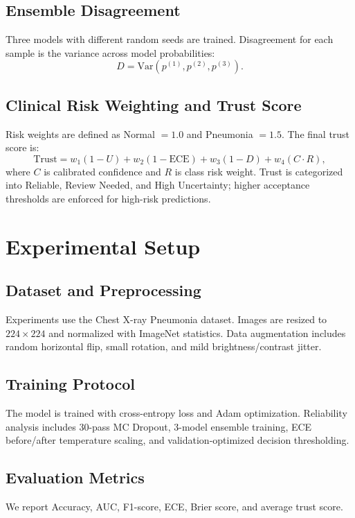 \documentclass[conference]{IEEEtran}
\begin{document}
\subsection{Ensemble Disagreement}
Three models with different random seeds are trained. Disagreement for each sample is the variance across model probabilities:
\begin{equation}
D = \mathrm{Var}(p^{(1)}, p^{(2)}, p^{(3)}).
\end{equation}

\subsection{Clinical Risk Weighting and Trust Score}
Risk weights are defined as Normal $=1.0$ and Pneumonia $=1.5$. The final trust score is:
\begin{equation}
\mathrm{Trust} = w_1(1-U) + w_2(1-\mathrm{ECE}) + w_3(1-D) + w_4(C\cdot R),
\end{equation}
where $C$ is calibrated confidence and $R$ is class risk weight. Trust is categorized into Reliable, Review Needed, and High Uncertainty; higher acceptance thresholds are enforced for high-risk predictions.

\section{Experimental Setup}

\subsection{Dataset and Preprocessing}
Experiments use the Chest X-ray Pneumonia dataset. Images are resized to $224\times224$ and normalized with ImageNet statistics. Data augmentation includes random horizontal flip, small rotation, and mild brightness/contrast jitter.

\subsection{Training Protocol}
The model is trained with cross-entropy loss and Adam optimization. Reliability analysis includes 30-pass MC Dropout, 3-model ensemble training, ECE before/after temperature scaling, and validation-optimized decision thresholding.

\subsection{Evaluation Metrics}
We report Accuracy, AUC, F1-score, ECE, Brier score, and average trust score.
\end{document}

